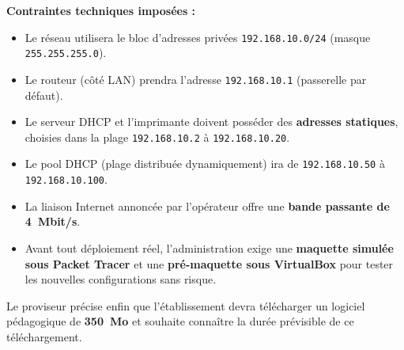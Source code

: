 \documentclass[11pt]{article}
\newcounter{popsec}
\newcounter{popsub}
\newcommand{\courssub}[1]{%
  \stepcounter{popsub}%
  \par\vspace{9pt}\noindent{\popxbold\fontsize{11.5}{13}\selectfont\color{popink}{\color{poporange}\thepopsec.\thepopsub}\hspace{6pt}#1}\par\nopagebreak\vspace{4pt}
}
\begin{document}
\textbf{Contraintes techniques imposées :}

\begin{itemize}
\item Le réseau utilisera le bloc d'adresses privées \texttt{192.168.10.0/24} (masque \texttt{255.255.255.0}).
\item Le routeur (côté LAN) prendra l'adresse \texttt{192.168.10.1} (passerelle par défaut).
\item Le serveur DHCP et l'imprimante doivent posséder des \textbf{adresses statiques}, choisies dans la plage \texttt{192.168.10.2} à \texttt{192.168.10.20}.
\item Le pool DHCP (plage distribuée dynamiquement) ira de \texttt{192.168.10.50} à \texttt{192.168.10.100}.
\item La liaison Internet annoncée par l'opérateur offre une \textbf{bande passante de \SI{4}{Mbit/s}}.
\item Avant tout déploiement réel, l'administration exige une \textbf{maquette simulée sous Packet Tracer} et une \textbf{pré-maquette sous VirtualBox} pour tester les nouvelles configurations sans risque.
\end{itemize}

Le proviseur précise enfin que l'établissement devra télécharger un logiciel pédagogique de \textbf{\SI{350}{Mo}} et souhaite connaître la durée prévisible de ce téléchargement.

\courssub{Consignes}
\end{document}
